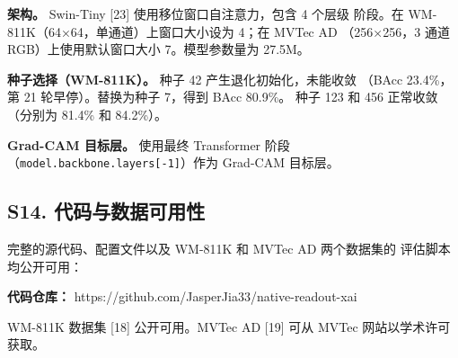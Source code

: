 \documentclass[11pt,a4paper]{article}
\begin{document}
\textbf{架构。} Swin-Tiny [23] 使用移位窗口自注意力，包含 4 个层级 阶段。在 WM-811K（64×64，单通道）上窗口大小设为 4；在 MVTec AD （256×256，3 通道 RGB）上使用默认窗口大小 7。模型参数量为 27.5M。

\textbf{种子选择（WM-811K）。} 种子 42 产生退化初始化，未能收敛 （BAcc 23.4\%，第 21 轮早停）。替换为种子 7，得到 BAcc 80.9\%。 种子 123 和 456 正常收敛（分别为 81.4\% 和 84.2\%）。

\textbf{Grad-CAM 目标层。} 使用最终 Transformer 阶段 （\texttt{model.backbone.layers[-1]}）作为 Grad-CAM 目标层。

\subsection*{S14. 代码与数据可用性}

完整的源代码、配置文件以及 WM-811K 和 MVTec AD 两个数据集的 评估脚本均公开可用：

\textbf{代码仓库：} https://github.com/JasperJia33/native-readout-xai

WM-811K 数据集 [18] 公开可用。MVTec AD [19] 可从 MVTec 网站以学术许可获取。
\end{document}
